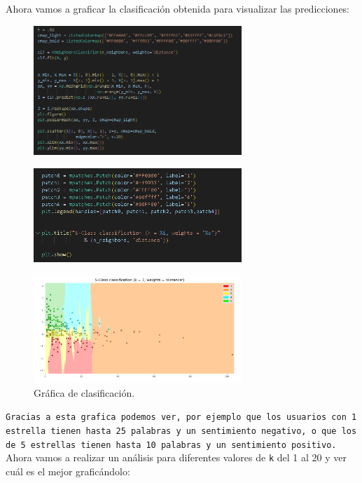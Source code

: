 \documentclass{article}
\begin{document}
Ahora vamos a graficar la clasificación obtenida para visualizar las predicciones:

\begin{figure}[H]
    \centering
    \includegraphics[width=0.7\textwidth]{img/18.png}
\end{figure}

\begin{figure}[H]
    \centering
    \includegraphics[width=0.7\textwidth]{img/19.png}
\end{figure}

\begin{figure}[H]
    \centering
    \includegraphics[width=0.7\textwidth]{img/20.png}
    \caption{Gráfica de clasificación.}
\end{figure}

\texttt{Gracias a esta grafica podemos ver, por ejemplo que los usuarios con 1 estrella tienen hasta 25 palabras y un sentimiento negativo, o que los de 5 estrellas tienen hasta 10 palabras y un sentimiento positivo. }
Ahora vamos a realizar un análisis para diferentes valores de \texttt{k} del 1 al 20 y ver cuál es el mejor graficándolo:
\end{document}
